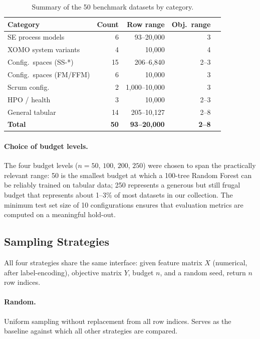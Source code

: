 \documentclass[sigconf,nonacm]{acmart}
\begin{document}
\begin{table}[t]
\caption{Summary of the 50 benchmark datasets by category.}
\label{tab:datasets}
\small
\begin{tabular}{lrrrc}
\toprule
Category & Count & Row range & Obj.\ range \\
\midrule
SE process models     & 6  & 93--20,000  & 3      \\
XOMO system variants  & 4  & 10,000      & 4      \\
Config.\ spaces (SS-*) & 15 & 206--6,840  & 2--3   \\
Config.\ spaces (FM/FFM) & 6 & 10,000     & 3      \\
Scrum config.         & 2  & 1,000--10,000 & 3    \\
HPO / health          & 3  & 10,000      & 2--3   \\
General tabular       & 14 & 205--10,127 & 2--8   \\
\midrule
\textbf{Total}        & \textbf{50} & \textbf{93--20,000} & \textbf{2--8} \\
\bottomrule
\end{tabular}
\end{table}

\paragraph{Choice of budget levels.}
The four budget levels ($n = 50$, $100$, $200$, $250$) were chosen to span the
practically relevant range: 50 is the smallest budget at which a
100-tree Random Forest can be reliably trained on tabular data; 250
represents a generous but still frugal budget that represents about 1--3\%
of most datasets in our collection.
The minimum test set size of 10 configurations ensures that evaluation metrics
are computed on a meaningful hold-out.

\subsection{Sampling Strategies}
\label{sec:strategies}

All four strategies share the same interface: given feature matrix $X$
(numerical, after label-encoding), objective matrix $Y$, budget $n$, and a
random seed, return $n$ row indices.

\paragraph{Random.}
Uniform sampling without replacement from all row indices.
Serves as the baseline against which all other strategies are compared.
\end{document}
